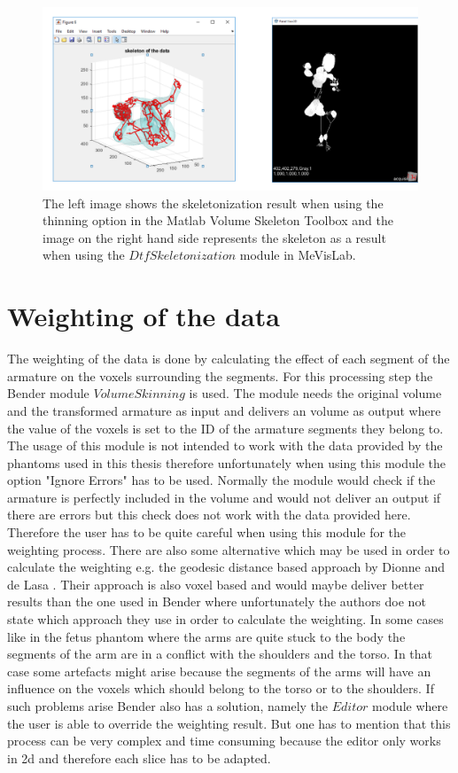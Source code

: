 \begin{figure} [!htb]
    \centering
	\includegraphics[width=15cm]{content/images/skeleton}
	\caption{The left image shows the skeletonization result when using the thinning option in the Matlab Volume Skeleton Toolbox and the image on the right hand side represents the skeleton as a result when using the $DtfSkeletonization$ module in MeVisLab.} 
	\label{fig:skeleton}
\end{figure}

\newpage
\section{Weighting of the data}
The weighting of the data is done by calculating the effect of each segment of the armature on the voxels surrounding the segments. For this processing step the Bender module $Volume Skinning$ is used. The module needs the original volume and the transformed armature as input and delivers an volume as output where the value of the voxels is set to the ID of the armature segments they belong to. The usage of this module is not intended to work with the data provided by the phantoms used in this thesis therefore unfortunately when using this module the option "Ignore Errors" has to be used. Normally the module would check if the armature is perfectly included in the volume and would not deliver an output if there are errors but this check does not work with the data provided here. Therefore the user has to be quite careful when using this module for the weighting process.\newline
There are also some alternative which may be used in order to calculate the weighting e.g. the geodesic distance based approach by Dionne and de Lasa \cite{Dionne2013GeodesicMeshes}. Their approach is also voxel based and would maybe deliver better results than the one used in Bender where unfortunately the authors doe not state which approach they use in order to calculate the weighting. In some cases like in the fetus phantom where the arms are quite stuck to the body the segments of the arm are in a conflict with the shoulders and the torso. In that case some artefacts might arise because the segments of the arms will have an influence on the voxels which should belong to the torso or to the shoulders. If such problems arise Bender also has a solution, namely the $Editor$ module where the user is able to override the weighting result. But one has to mention that this process can be very complex and time consuming because the editor only works in \gls{2d} and therefore each slice has to be adapted.


